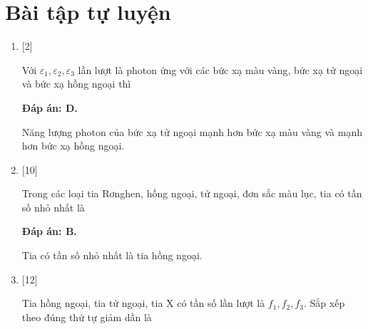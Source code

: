 \section{Bài tập tự luyện}
\begin{enumerate}[label=\bfseries Câu \arabic*:]
	
	\item {} [2]
	\cauhoi
	{Với $\varepsilon_{1}, \varepsilon_{2}, \varepsilon_{3}$ lần lượt là photon ứng với các bức xạ màu vàng, bức xạ tử ngoại và bức xạ hồng ngoại thì
	}
	
	\loigiai
	{		\textbf{Đáp án: D.}
		
		Năng lượng photon của bức xạ tử ngoại mạnh hơn bức xạ màu vàng và mạnh hơn bức xạ hồng ngoại.
	}
	
	\item {} [10]
	\cauhoi
	{Trong các loại tia Rơnghen, hồng ngoại, tử ngoại, đơn sắc màu lục, tia có tần số nhỏ nhất là 
	}
	
	\loigiai
	{		\textbf{Đáp án: B.}
		
		Tia có tần số nhỏ nhất là tia hồng ngoại.
	}
	
	\item {} [12]
	\cauhoi
	{Tia hồng ngoại, tia tử ngoại, tia X có tần số lần lượt là $f_{1}, f_{2}, f_{3}$. Sắp xếp theo đúng thứ tự giảm dần là
	}
	

\end{enumerate}
